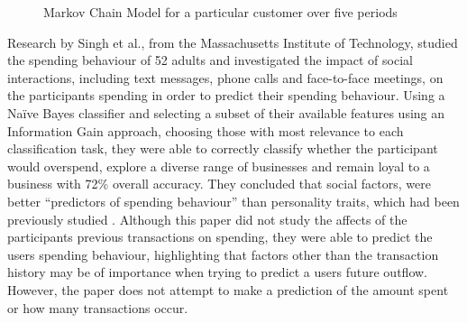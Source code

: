 \begin{figure}[h]
    \centering
    \caption[Markov Chain Model of customer spending]{Markov Chain Model for a particular customer over five periods \parencite[Adapted from Fig. 1]{pfeifer2000modeling}}
    \label{fig:preifermarkovchain}
\end{figure}

Research by Singh et al., from the Massachusetts Institute of Technology, studied the spending behaviour of 52 adults and investigated the impact of social interactions, including text messages, phone calls and face-to-face meetings, on the participants spending in order to predict their spending behaviour. Using a Na\"{i}ve Bayes classifier and selecting a subset of their available features using an Information Gain approach, choosing those with most relevance to each classification task, they were able to correctly classify whether the participant would overspend, explore a diverse range of businesses and remain loyal to a business with 72\% overall accuracy. They concluded that social factors, were better ``predictors of spending behaviour'' than personality traits, which had been previously studied \parencite{singh2013spendingbehaviour}.
%
Although this paper did not study the affects of the participants previous transactions on spending, they were able to predict the users spending behaviour, highlighting that factors other than the transaction history may be of importance when trying to predict a users future outflow. However, the paper does not attempt to make a prediction of the amount spent or how many transactions occur.


